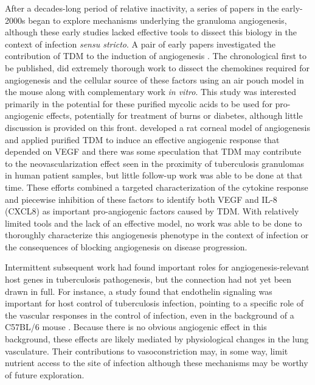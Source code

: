 After a decades\hyp{}long period of relative inactivity, a series of papers in the early\hyp{}2000s began to explore mechanisms underlying the granuloma angiogenesis, although these early studies lacked effective tools to dissect this biology in the context of infection \textit{sensu stricto}. A pair of early papers investigated the contribution of TDM to the induction of angiogenesis . The chronological first to be published, \citet{Sakaguchi2000} did extremely thorough work to dissect the chemokines required for angiogenesis and the cellular source of these factors using an air pouch model in the mouse along with complementary work \textit{in vitro}. This study was interested primarily in the potential for these purified mycolic acids to be used for pro\hyp{}angiogenic effects, potentially for treatment of burns or diabetes, although little discussion is provided on this front. \citet{Saita2000} developed a rat corneal model of angiogenesis and applied purified TDM to induce an effective angiogenic response that depended on VEGF and there was some speculation that TDM may contribute to the neovascularization effect seen in the proximity of tuberculosis granulomas in human patient samples, but little follow\hyp{}up work was able to be done at that time. These efforts combined a targeted characterization of the cytokine response and piecewise inhibition of these factors to identify both VEGF and IL\hyp{}8 (CXCL8) as important pro\hyp{}angiogenic factors caused by TDM. With relatively limited tools and the lack of an effective model, no work was able to be done to thoroughly characterize this angiogenesis phenotype in the context of infection or the consequences of blocking angiogenesis on disease progression.

Intermittent subsequent work had found important roles for angiogenesis\hyp{}relevant host genes in tuberculosis pathogenesis, but the connection had not yet been drawn in full. For instance, a study found that endothelin signaling was important for host control of tuberculosis infection, pointing to a specific role of the vascular responses in the control of infection, even in the background of a C57BL/6 mouse \citep{Correa2014}. Because there is no obvious angiogenic effect in this background, these effects are likely mediated by physiological changes in the lung vasculature. Their contributions to vasoconstriction may, in some way, limit nutrient access to the site of infection although these mechanisms may be worthy of future exploration.  


